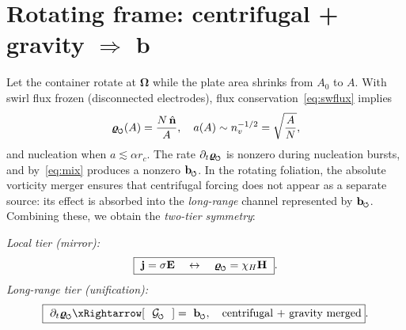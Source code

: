 \documentclass[11pt,a4paper]{article}
\newcommand{\swirlarrow}{%
    \mathchoice{\mkern-2mu\scriptstyle\boldsymbol{\circlearrowleft}}%
    {\mkern-2mu\scriptstyle\boldsymbol{\circlearrowleft}}%
    {\mkern-2mu\scriptscriptstyle\boldsymbol{\circlearrowleft}}%
    {\mkern-2mu\scriptscriptstyle\boldsymbol{\circlearrowleft}}%
}
\begin{document}
\section{Rotating frame: centrifugal + gravity $\Rightarrow$ $\mathbf b$}
Let the container rotate at $\boldsymbol\Omega$ while the plate area shrinks from $A_0$ to $A$. With swirl flux frozen (disconnected electrodes), flux conservation~\eqref{eq:swflux} implies
\begin{equation}
\bm{\varrho}_{\rm \swirlarrow}(A) = \frac{N \,\hat{\mathbf n}}{A},
\quad a(A)\sim n_v^{-1/2}=\sqrt{\frac{A}{N}},
\end{equation}
and nucleation when $a\lesssim \alpha r_c$. The rate $\partial_t \bm{\varrho}_{\rm \swirlarrow}$ is nonzero during nucleation bursts, and by~\eqref{eq:mix} produces a nonzero $\mathbf b_{\rm \swirlarrow}$. In the rotating foliation, the absolute vorticity merger ensures that centrifugal forcing does not appear as a separate source: its effect is absorbed into the \emph{long-range} channel represented by $\mathbf b_{\rm \swirlarrow}$. Combining these, we obtain the \emph{two-tier symmetry}:

\medskip
\noindent\emph{Local tier (mirror):}
\[
    \boxed{\ \mathbf j=\sigma\mathbf E \quad \leftrightarrow \quad \bm{\varrho}_{\rm \swirlarrow}=\chi_H\mathbf H\ }.
\]
\noindent\emph{Long-range tier (unification):}
\[
    \boxed{\ \partial_t \bm{\varrho}_{\rm \swirlarrow} \xRightarrow[\ \ \mathcal G_{\rm \swirlarrow}\ \ ] = \ \mathbf b_{\rm \swirlarrow},
        \quad \text{centrifugal + gravity merged} }.
\]

\end{document}
